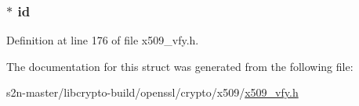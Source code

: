 \subsubsection[{\texorpdfstring{id}{id}}]{ $\ast$ id}\hypertarget{struct_x509___v_e_r_i_f_y___p_a_r_a_m__st_a1e2d974ae8782384226dcb0af0fa87c8}{}\label{struct_x509___v_e_r_i_f_y___p_a_r_a_m__st_a1e2d974ae8782384226dcb0af0fa87c8}


Definition at line 176 of file x509\+\_\+vfy.\+h.



The documentation for this struct was generated from the following file\+:\begin{DoxyCompactItemize}
\item 
s2n-\/master/libcrypto-\/build/openssl/crypto/x509/\hyperlink{crypto_2x509_2x509__vfy_8h}{x509\+\_\+vfy.\+h}\end{DoxyCompactItemize}
